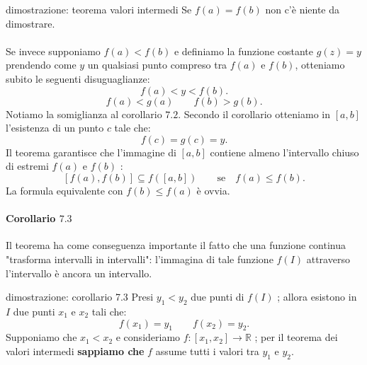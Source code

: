 \documentclass[x11names]{article}
\begin{document}
	\begin{es}{dimostrazione: teorema valori intermedi}
		Se $f\left(a\right) = f\left(b\right)$ non c'è niente da dimostrare.
		\\ \\
		Se invece supponiamo $f\left(a\right) < f\left(b\right)$ e definiamo la funzione costante $g\left(z\right) = y$ prendendo come $y$ un qualsiasi punto compreso tra $f\left(a\right)$ e $f\left(b\right)$, otteniamo subito le seguenti disuguaglianze:
		\[
		f\left(a\right) < y < f\left(b\right)
		.\] 
		\[
		f\left(a\right) < g\left(a\right) \qquad f\left(b\right) > g\left(b\right)
		.\] 
		Notiamo la somiglianza al corollario $7.2$. Secondo il corollario otteniamo in  $\left[a,b\right]$ l'esistenza di un punto $c$ tale che:
		\[
		f\left(c\right) = g\left(c\right) = y
		.\] 
		Il teorema garantisce che l'immagine di $\left[a,b\right]$ contiene almeno l'intervallo chiuso di estremi $f\left(a\right)$ e $f\left(b\right)$ :
		\[
		\left[f\left(a\right),f\left(b\right)\right] \subseteq f\left(\left[a,b\right]\right) \qquad \text{se} \quad f\left(a\right) \leq f\left(b\right)
		.\] 
		La formula equivalente con $f\left(b\right) \leq f\left(a\right)$ è ovvia.
	\end{es}
	
	\paragraph{Corollario $7.3$}
	Il teorema ha come conseguenza importante il fatto che una funzione continua "trasforma intervalli in intervalli": l'immagina di tale funzione $f\left(I\right)$ attraverso l'intervallo è ancora un intervallo.
	
	\begin{es}{dimostrazione: corollario 7.3}
		Presi $y_1 < y_2$ due punti di $f\left(I\right)$ ; allora esistono in $I$ due punti $x_1$ e $x_2$ tali che:
		\[
		f\left(x_1\right) = y_1 \qquad f\left(x_2\right) = y_2
		.\] 
		Supponiamo che $x_1 < x_2$ e consideriamo $f:\left[x_1,x_2\right] \rightarrow \mathbb{R}$ ; per il teorema dei valori intermedi \textbf{sappiamo che} $f$ assume tutti i valori tra $y_1$ e $y_2$.
	\end{es}
	
\end{document}
